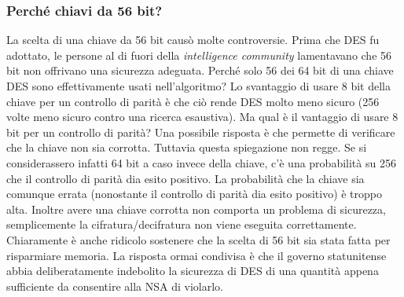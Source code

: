 \subsubsection{Perché chiavi da 56 bit?}
La scelta di una chiave da 56 bit causò molte controversie. Prima che DES fu adottato, le persone al di fuori della \textit{intelligence community} lamentavano che 56 bit non offrivano una sicurezza adeguata. Perché solo 56 dei 64 bit di una chiave DES sono effettivamente usati nell'algoritmo? Lo svantaggio di usare 8 bit della chiave per un controllo di parità è che ciò rende DES molto meno sicuro (256 volte meno sicuro contro una ricerca esaustiva). Ma qual è il vantaggio di usare 8 bit per un controllo di parità? Una possibile risposta è che permette di verificare che la chiave non sia corrotta. Tuttavia questa spiegazione non regge. Se si considerassero infatti 64 bit a caso invece della chiave, c'è una probabilità su 256 che il controllo di parità dia esito positivo. La probabilità che la chiave sia comunque errata (nonostante il controllo di parità dia esito positivo) è troppo alta. Inoltre avere una chiave corrotta non comporta un problema di sicurezza, semplicemente la cifratura/decifratura non viene eseguita correttamente. Chiaramente è anche ridicolo sostenere che la scelta di 56 bit sia stata fatta per risparmiare memoria. \newline La risposta ormai condivisa è che il governo statunitense abbia deliberatamente indebolito la sicurezza di DES di una quantità appena sufficiente da consentire alla NSA di violarlo. \\

